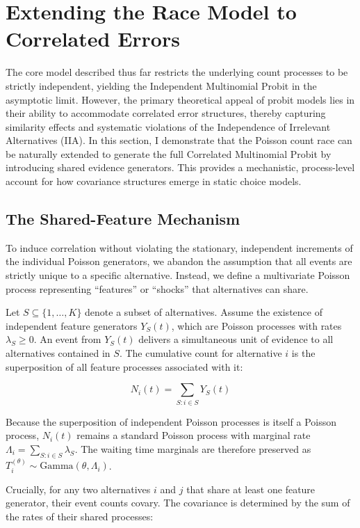 \documentclass[
  man,
  floatsintext,
  longtable,
  a4paper,
  nolmodern,
  notxfonts,
  notimes,
  colorlinks=true,linkcolor=blue,citecolor=blue,urlcolor=blue]{apa7}
\begin{document}
\section{Extending the Race Model to Correlated
Errors}\label{extending-the-race-model-to-correlated-errors}

The core model described thus far restricts the underlying count
processes to be strictly independent, yielding the Independent
Multinomial Probit in the asymptotic limit. However, the primary
theoretical appeal of probit models lies in their ability to accommodate
correlated error structures, thereby capturing similarity effects and
systematic violations of the Independence of Irrelevant Alternatives
(IIA). In this section, I demonstrate that the Poisson count race can be
naturally extended to generate the full Correlated Multinomial Probit by
introducing shared evidence generators. This provides a mechanistic,
process-level account for how covariance structures emerge in static
choice models.

\subsection{The Shared-Feature
Mechanism}\label{the-shared-feature-mechanism}

To induce correlation without violating the stationary, independent
increments of the individual Poisson generators, we abandon the
assumption that all events are strictly unique to a specific
alternative. Instead, we define a multivariate Poisson process
representing ``features'' or ``shocks'' that alternatives can share.

Let \(S \subseteq \{1, \dots, K\}\) denote a subset of alternatives.
Assume the existence of independent feature generators \(Y_S(t)\), which
are Poisson processes with rates \(\lambda_S \ge 0\). An event from
\(Y_S(t)\) delivers a simultaneous unit of evidence to all alternatives
contained in \(S\). The cumulative count for alternative \(i\) is the
superposition of all feature processes associated with it:

\[N_i(t) = \sum_{S: i \in S} Y_S(t)\]

Because the superposition of independent Poisson processes is itself a
Poisson process, \(N_i(t)\) remains a standard Poisson process with
marginal rate \(\Lambda_i = \sum_{S: i \in S} \lambda_S\). The waiting
time marginals are therefore preserved as
\(T_i^{(\theta)} \sim \text{Gamma}(\theta, \Lambda_i)\).

Crucially, for any two alternatives \(i\) and \(j\) that share at least
one feature generator, their event counts covary. The covariance is
determined by the sum of the rates of their shared processes:
\end{document}

